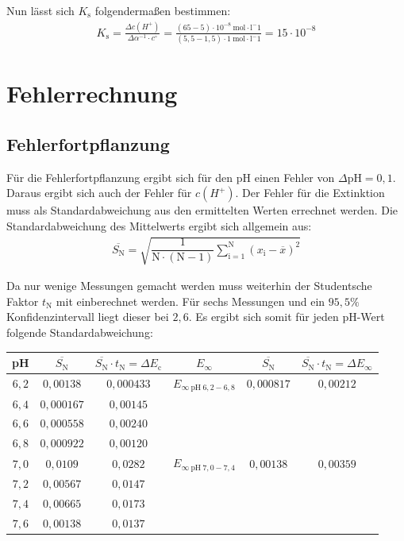 \documentclass[12pt,a4paper,titlepage,headinclude,bibtotoc]{scrartcl}
\begin{document}
Nun lässt sich $K_{\mathrm{s}}$ folgendermaßen bestimmen:
\begin{align}
K_{\mathrm{s}} = \frac{\Delta c(H^+)}{\Delta \alpha^{-1} \cdot c^{\circ}} = \frac{(65-5) \cdot 10^{-8} {~}\mathrm{mol \cdot l^-1}}{(5,5-1,5) \cdot 1 {~}\mathrm{mol \cdot l^-1}} = 15 \cdot 10^{-8}
\end{align}

\newpage

\section{Fehlerrechnung}
\subsection{Fehlerfortpflanzung}
Für die Fehlerfortpflanzung ergibt sich für den pH einen Fehler von $\Delta \mathrm{pH} = 0,1$. Daraus ergibt sich auch der Fehler für $c(H^+)$. Der Fehler für die Extinktion muss als Standardabweichung aus den ermittelten Werten errechnet werden.
Die Standardabweichung des Mittelwerts ergibt sich allgemein aus:
\begin{align}
\overline{S_\mathrm{N}} = \sqrt{\dfrac{1}{\mathrm{N}\cdot (\mathrm{N}-1)} \sum_{\mathrm{i}=1} ^{\mathrm{N}}(x_\mathrm{i}-\overline{x})^2}
\end{align}

Da nur wenige Messungen gemacht werden muss weiterhin der Studentsche Faktor $t_{\mathrm{N}}$ mit einberechnet werden. Für sechs Messungen und ein $95,5\%$ Konfidenzintervall liegt dieser bei $2,6$. Es ergibt sich somit für jeden pH-Wert folgende Standardabweichung:

\begin{table} [h]
\centering
\begin{tabular} {|c|c|c||c|c|c|}
  \hline
  pH & $\overline{S_\mathrm{N}}$ & $\overline{S_\mathrm{N}} \cdot t_{\mathrm{N}} = \Delta E_{\mathrm{c}} $ & $E_{\infty}$ & $\overline{S_\mathrm{N}}$ & $\overline{S_\mathrm{N}} \cdot t_{\mathrm{N}} = \Delta E_{\infty} $ \\\hline\hline
  $6,2$ & $0,00138$& $0,000433$&$E_{\infty {~}\mathrm{pH}{~} 6,2-6,8}$ &$0,000817$ & $0,00212$\\
  $6,4$& $0,000167$& $0,00145$&&& \\
  $6,6$& $0,000558$& $0,00240$&&&\\
  $6,8$& $0,000922$&$0,00120$&&&\\\hline\hline
  $7,0$& $0,0109$& $0,0282$ &$E_{\infty {~}\mathrm{pH}{~} 7,0-7,4}$&$0,00138$& $0,00359$\\
  $7,2$& $0,00567$& $0,0147$&&&\\
  $7,4$& $0,00665$&$0,0173$&&&\\
  $7,6$& $0,00138$&$0,0137$&&&\\\hline
  
 \end{tabular}
\end{table}
\end{document}

